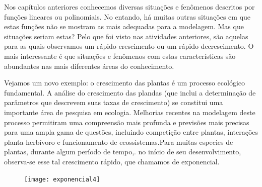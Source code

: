 
Nos capítulos anteriores conhecemos diversas situações e fenômenos descritos por funções lineares ou polinomiais. No entando, há muitas outras situações em que estas funções não se mostram as mais adequadas para a modelagem. Mas que situações seriam estas? Pelo que foi visto nas atividades anteriores, são aquelas para as quais observamos um rápido crescimento ou um rápido decrescimento. O mais interessante é que situações e fenômenos com estas características são abundantes nas mais diferentes áreas do conhecimento.

Vejamos um novo exemplo: o crescimento das plantas é um processo ecológico fundamental. A análise do crescimento das plandas (que inclui a determinação de parâmetros que descrevem suas taxas de crescimento) se constitui uma importante área de pesquisa em ecologia. Melhorias recentes na modelagem deste processo permitiram uma compreensão mais profunda e previsões mais precisas para uma ampla gama de questões, incluindo competição entre plantas, interações planta-herbívoro e funcionamento de ecossistemas.Para muitas especies de plantas, durante algum período de tempo,. no início de seu desenvolvimento, observa-se esse tal crescimento rápido, que chamamos de exponencial.

\begin{figure}[H]
\centering
\texttt{[image: exponencial4]}

\end{figure}



